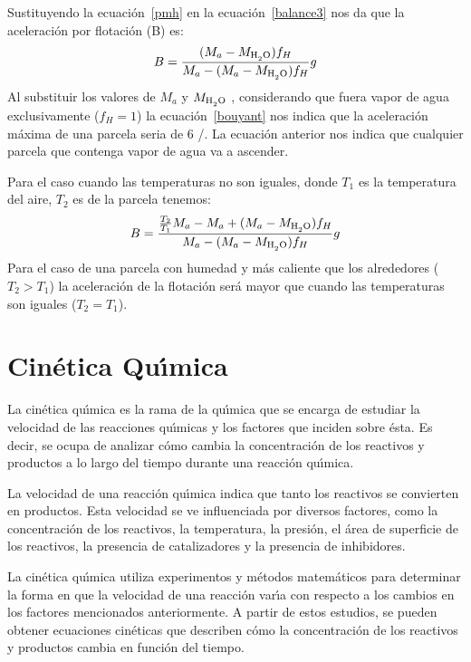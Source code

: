 Sustituyendo la ecuaci\'on~\ref{pmh} en la ecuaci\'on~\ref{balance3} nos da que la aceleraci\'on por flotaci\'on (B) es:
\begin{equation}
B=\frac{(M_a-M_{\ce{H2O}})f_H }{M_a-(M_a-M_{\ce{H2O}})f_H} g
\label{bouyant}
\end{equation}
Al substituir los valores de $M_a$ y $M_{\ce{H2O}}$ , considerando que fuera  vapor de agua exclusivamente ($f_H=1$) la ecuaci\'on~\ref{bouyant} nos indica que la aceleraci\'on m\'axima de una parcela seria de  $6$ \metre/\square\second . La ecuaci\'on anterior nos indica que cualquier parcela que contenga vapor de agua va a ascender.

Para el caso cuando las temperaturas no son iguales,  donde $T_1$ es la temperatura del aire, $T_2$ es de la parcela tenemos:
\begin{equation}
B=\frac{\frac{T_2}{T_1}M_a-M_a+(M_a-M_{\ce{H2O}})f_H }{M_a-(M_a-M_{\ce{H2O}})f_H} g
\label{bouyant2}
\end{equation}
Para el caso de una parcela con humedad y m\'as caliente que los alrededores ($T_2>T_1$) la aceleraci\'on de la flotaci\'on ser\'a mayor que cuando las temperaturas son iguales ($T_2=T_1$). 

\section[Cin\'etica]{Cin\'etica Qu\'{\i}mica}
\label{cineq}

La cin\'etica qu\'{\i}mica es la rama de la qu\'{\i}mica que se encarga de estudiar la velocidad de las reacciones qu\'{\i}micas y los factores que inciden sobre \'esta. Es decir, se ocupa de analizar c\'omo cambia la concentraci\'on de los reactivos y productos a lo largo del tiempo durante una reacci\'on qu\'{\i}mica.

La velocidad de una reacci\'on qu\'{\i}mica indica que tanto  los reactivos se convierten en productos. Esta velocidad se ve influenciada por diversos factores, como la concentraci\'on de los reactivos, la temperatura, la presi\'on, el \'area de superficie de los reactivos, la presencia de catalizadores y la presencia de inhibidores.

La cin\'etica qu\'{\i}mica utiliza experimentos y m\'etodos matem\'aticos para determinar la forma en que la velocidad de una reacci\'on var\'{\i}a con respecto a los cambios en los factores mencionados anteriormente. A partir de estos estudios, se pueden obtener ecuaciones cin\'eticas que describen c\'omo la concentraci\'on de los reactivos y productos cambia en funci\'on del tiempo.


